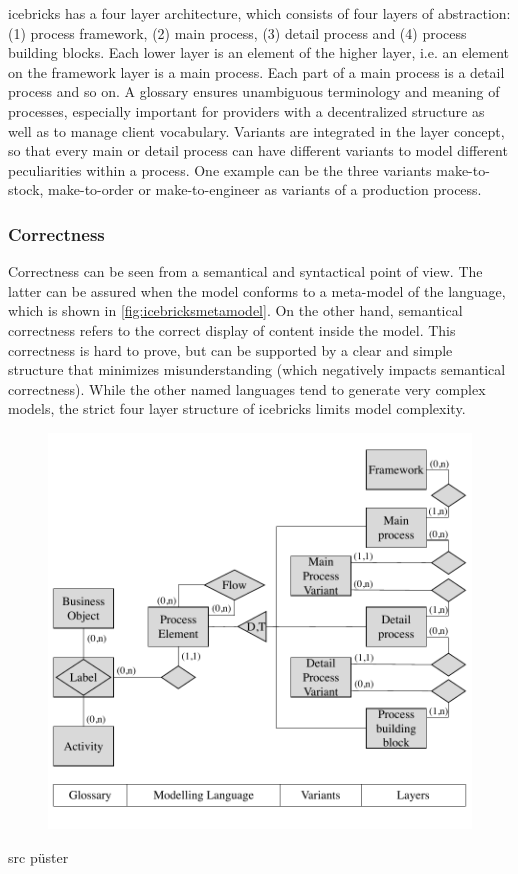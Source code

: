 	 icebricks has a four layer architecture, which consists of four layers of abstraction: (1) process framework, (2) main process, (3) detail process and (4) process building blocks. Each lower layer is an element of the higher layer, i.e. an element on the framework layer is a main process. Each part of a main process is a detail process and so on. A glossary ensures unambiguous terminology and meaning of processes, especially important for providers with a decentralized structure as well as to manage client vocabulary. Variants are integrated in the layer concept, so that every main or detail process can have different variants to model different peculiarities within a process. One example can be the three variants make-to-stock, make-to-order or make-to-engineer as variants of a production process. 
	 
	 
	 \subsubsection{Correctness}
	 Correctness can be seen from a semantical and syntactical point of view. The latter can be assured when the model conforms to a meta-model of the language, which is shown in \ref{fig:icebricksmetamodel}. On the other hand, semantical correctness refers to the correct display of content inside the model. This correctness is hard to prove, but can be supported by a clear and simple structure that minimizes misunderstanding (which negatively impacts semantical correctness). While the other named languages tend to generate very complex models, the strict four layer structure of icebricks limits model complexity. 
	 
	 	 \begin{figure}[caption={icebricks meta model}, label={fig:icebricksmetamodel}]
	 	{	\includegraphics[width=.8\textwidth]{figures/icebricksmetamodel.pdf}}
	 \end{figure} src püster
 
